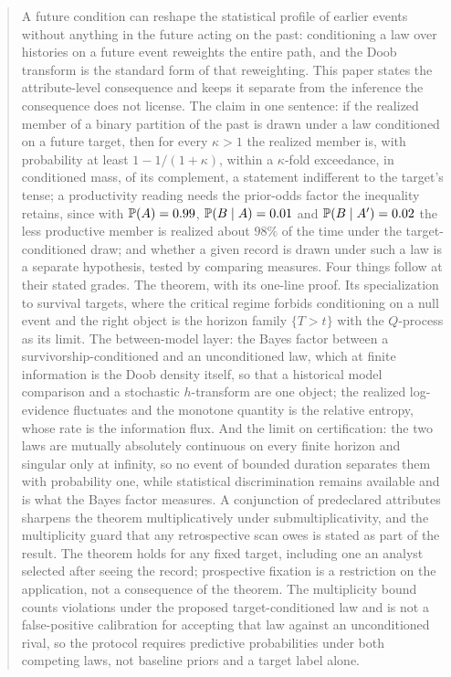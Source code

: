 \begin{abstract}
A future condition can reshape the statistical profile of earlier events
without anything in the future acting on the past: conditioning a law over
histories on a future event reweights the entire path, and the Doob
transform is the standard form of that reweighting. This paper states the
attribute-level consequence and keeps it separate from the inference the
consequence does not license. The claim in one sentence: if the realized
member of a binary partition of the past is drawn under a law conditioned
on a future target, then for every $\kappa>1$ the realized member is, with
probability at least $1-1/(1+\kappa)$, within a $\kappa$-fold exceedance, in conditioned mass, of its complement, a statement indifferent to the target's tense; a productivity reading needs the prior-odds factor the inequality retains, since with $\PP(A) = 0.99$, $\PP(B \mid A) = 0.01$ and $\PP(B \mid A') = 0.02$ the less productive member is realized about $98\%$ of the time under the target-conditioned draw; and whether a given record is drawn under such a law is a
separate hypothesis, tested by comparing measures. Four things follow at
their stated grades. The theorem, with its one-line proof. Its
specialization to survival targets, where the critical regime forbids
conditioning on a null event and the right object is the horizon family
$\{T>t\}$ with the $Q$-process as its limit. The between-model layer: the
Bayes factor between a survivorship-conditioned and an unconditioned law,
which at finite information is the Doob density itself, so that a
historical model comparison and a stochastic $h$-transform are one object;
the realized log-evidence fluctuates and the monotone quantity is the
relative entropy, whose rate is the information flux. And the limit on
certification: the two laws are mutually absolutely continuous on every
finite horizon and singular only at infinity, so no event of bounded
duration separates them with probability one, while statistical
discrimination remains available and is what the Bayes factor measures.
A conjunction of predeclared attributes sharpens the theorem
multiplicatively under submultiplicativity, and the multiplicity guard
that any retrospective scan owes is stated as part of the result. The theorem holds for any fixed target, including one an analyst selected after seeing the record; prospective fixation is a restriction on the application, not a consequence of the theorem. The multiplicity bound counts violations under the proposed target-conditioned law and is not a false-positive calibration for accepting that law against an unconditioned rival, so the protocol requires predictive probabilities under both competing laws, not baseline priors and a target label alone.
\end{abstract}

